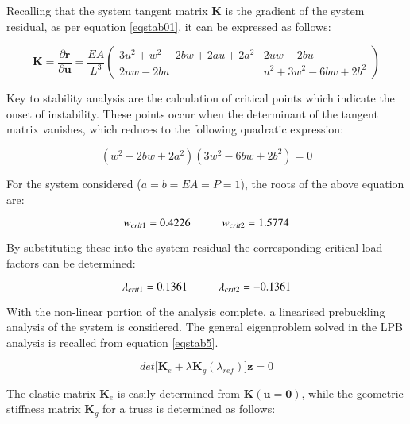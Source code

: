 Recalling that the system tangent matrix $\mathbf{K}$ is the gradient of the system residual, as per equation \ref{eqstab01}, it can be expressed as follows:

\begin{equation} 
\mathbf{K} = 
\frac{\partial \mathbf{r}}{\partial \mathbf{u}}
=
\frac{EA}{L^3}
\begin{pmatrix}
3u^2 + w^2 - 2bw +2au +2a^2 & 2uw -2bu \\
2uw - 2bu & u^2 + 3w^2 - 6bw + 2b^2
\end{pmatrix}
\label{eqapp0_7}
\end{equation}

Key to stability analysis are the calculation of critical points which indicate the onset of instability. These points occur when the determinant of the tangent matrix vanishes, which reduces to the following quadratic expression:

\begin{equation} 
(w^2 - 2bw +2a^2)
(3w^2 -6bw +2b^2) = 0
\label{eqapp0_8}
\end{equation}

For the system considered ($a=b=EA=P=1$), the roots of the above equation are:

\begin{equation} 
w_{crit1} = 0.4226
\hspace{10mm}
w_{crit2} = 1.5774
\label{eqapp0_9}
\end{equation}

By substituting these into the system residual the corresponding critical load factors can be determined:

\begin{equation} 
\lambda_{crit1} = 0.1361
\hspace{10mm}
\lambda_{crit2} = -0.1361
\label{eqapp0_10}
\end{equation}

With the non-linear portion of the analysis complete, a linearised prebuckling analysis of the system is considered. The general eigenproblem solved in the LPB analysis is recalled from equation \ref{eqstab5}.

 \begin{equation} 
det\big[
\mathbf{K}_e +
{\lambda}
\mathbf{K}_g(\lambda_{ref})
\big]\mathbf{z} = 0
\label{eqapp0_11}
\end{equation}

The elastic matrix $\mathbf{K}_e$ is easily determined from $\mathbf{K}(\mathbf{u} = \mathbf{0})$, while the geometric stiffness matrix $\mathbf{K}_g$ for a truss is determined as follows:

